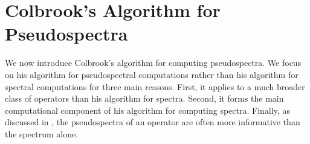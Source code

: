 

\section{Colbrook's Algorithm for Pseudospectra}





We now introduce Colbrook's algorithm for computing pseudospectra. We focus on his algorithm for pseudospectral computations rather than his algorithm for spectral computations for three main reasons. First, it applies to a much broader class of operators than his algorithm for spectra. Second, it forms the main computational component of his algorithm for computing spectra. Finally, as discussed in , the pseudospectra of an operator are often more informative than the spectrum alone.

